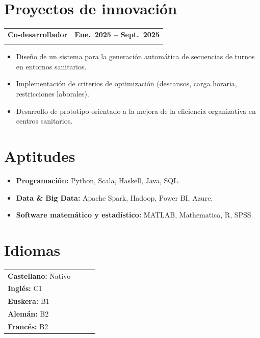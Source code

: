 \documentclass[11pt, a4paper]{article}
\makeatletter
\newcommand{\cventry}[4]{%
  \noindent
  \begin{tabularx}{\linewidth}{@{}X r@{}}
    \textbf{#1} & \textbf{#2}\\
    \textit{#3} & \textit{#4}
  \end{tabularx}%
}
\makeatother
\begin{document}
\section{Proyectos de innovación}

\cventry{Co-desarrollador}%
        {Ene.\ 2025 -- Sept.\ 2025}%
        {}{}
\begin{itemize}[nosep, leftmargin=1.2em, topsep=4pt]
  \item Diseño de un sistema para la generación automática de secuencias de turnos
        en entornos sanitarios.
  \item Implementación de criterios de optimización (descansos, carga horaria,
        restricciones laborales).
  \item Desarrollo de prototipo orientado a la mejora de la eficiencia organizativa
        en centros sanitarios.
\end{itemize}

\section{Aptitudes}

\begin{itemize}[nosep, leftmargin=1.2em]
  \item \textbf{Programación:} Python, Scala, Haskell, Java, SQL.
  \item \textbf{Data \& Big Data:} Apache Spark, Hadoop, Power BI, Azure.
  \item \textbf{Software matemático y estadístico:} MATLAB, Mathematica, R, SPSS.
\end{itemize}

\section{Idiomas}

\begin{tabularx}{\linewidth}{@{}l l l l@{}}
  \textbf{Castellano:} Nativo \\

  \textbf{Inglés:} C1  \\

  \textbf{Euskera:} B1 \\

  \textbf{Alemán:} B2 \\

  \textbf{Francés:} B2 & & &
\end{tabularx}
\end{document}
